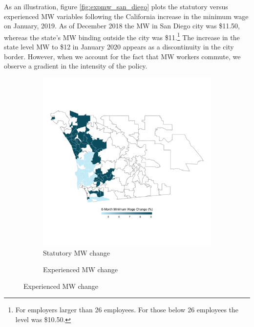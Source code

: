
As an illustration, figure \ref{fig:expmw_san_diego} plots the statutory versus experienced 
MW variables following the California increase in the minimum wage on January, 2019. As of 
December 2018 the MW in San Diego city was \$11.50, whereas the state's MW binding outside 
the city was \$11.\footnote{For employers larger than 26 employees. For those below 26 
	employees the level was \$10.50.}
The increase in the state level MW to \$12 in January 2020 appears as a discontinuity in the 
city border. However, when we account for the fact that MW workers commute, we observe a 
gradient in the intensity of the policy.


\begin{figure}
	\caption{The California MW increase of January 2019 in San Diego}
	\label{fig:expmw_san_diego}
	\centering
	\begin{subfigure}[b]{0.55\textwidth}
		\caption{Statutory MW change}
		\includegraphics[width = \textwidth]
			{../../analysis/descriptive/output/San_Diego_mw_msa.png}
	\end{subfigure}
	\begin{subfigure}[b]{0.55\textwidth}
		\caption{Experienced MW change}

\end{subfigure}
\end{figure}
